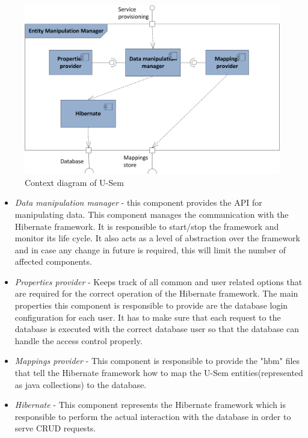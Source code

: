 \documentclass[a4paper, notitlepage]{article}
\begin{document}
\begin{figure}[h!]
  \centering
  	\includegraphics[scale=0.7]{functional/func_manip.png}
  \caption{Context diagram of U-Sem }
  \label{fig_context}
\end{figure}

\begin{itemize}
	\item \textit{Data manipulation manager} - this component provides the API for manipulating data. This component manages the communication with the Hibernate framework. It is responsible to start/stop the framework and monitor its life cycle. It also acts as a level of abstraction over the framework and in case any change in future is required, this will limit the number of affected components.
	
	\item \textit{Properties provider} - Keeps track of all common and user related options that are required for the correct operation of the Hibernate framework. The main properties this component is responsible to provide are the database login configuration for each user. It has to make sure that each request to the database is executed with the correct database user so that the database can handle the access control properly.
	
	\item \textit{Mappings provider} - This component is responsible to provide the "hbm" files that tell the Hibernate framework how to map the U-Sem entities(represented as java collections) to the database.
	
	\item \textit{Hibernate} - This component represents the Hibernate framework which is responsible to perform the actual interaction with the database in order to serve CRUD requests.  
\end{itemize}
\end{document}
